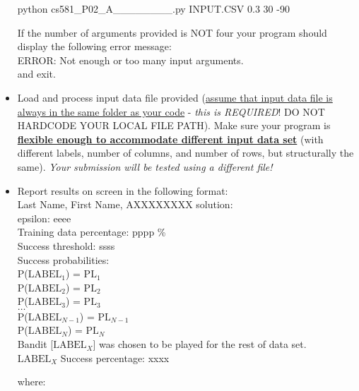 \documentclass[
	type={Programming},
	assignment={2},
	points={100},
	duedate={Sunday, April 7, 2024, 11:59 CST},
	template=true,
]{cs581homework}
\begin{document}
\begin{problemdescription}
\begin{itemize}
		\begin{center}
			python cs581\_P02\_A________.py INPUT.CSV 0.3 30 -90
		\end{center}

		If the number of arguments provided is NOT four your program should display the following error message:\\

		\hspace{15pt} ERROR: Not enough or too many input arguments.\\

		and exit.
		\item Load and process input data file provided (\ul{assume that input data file is always in the same folder as your code} - \emph{this is REQUIRED}!
		DO NOT HARDCODE YOUR LOCAL FILE PATH).
		Make sure your program is \textbf{\ul{flexible enough to accommodate different input data set}} (with different labels, number of columns, and number of rows, but structurally the same).
		\emph{Your submission will be tested using a different file!}
		\item Report results on screen in the following format:\\

		Last Name, First Name, AXXXXXXXX solution:\\
		epsilon: eeee\\
		Training data percentage: pppp \%\\
		Success threshold: ssss\\

		Success probabilities:\\
		P($\mbox{LABEL}_{1}$) = $\mbox{PL}_{1}$\\
		P($\mbox{LABEL}_{2}$) = $\mbox{PL}_{2}$\\
		P($\mbox{LABEL}_{3}$) = $\mbox{PL}_{3}$\\
		$\dots$\\
		P($\mbox{LABEL}_{N-1}$) = $\mbox{PL}_{N-1}$\\
		P($\mbox{LABEL}_{N}$) = $\mbox{PL}_{N}$\\

		Bandit [$\mbox{LABEL}_{X}$] was chosen to be played for the rest of data set.\\
		$\mbox{LABEL}_{X}$ Success percentage: xxxx

		where:


\end{itemize}
\end{problemdescription}
\end{document}

